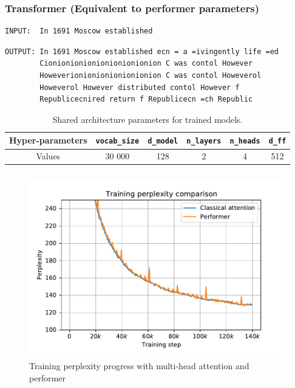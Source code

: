 \subsubsection*{Transformer (Equivalent to performer parameters)}
\begin{verbatim}
INPUT:  In 1691 Moscow established
\end{verbatim}
\begin{verbatim}
OUTPUT: In 1691 Moscow established ecn = a =ivingently life =ed 
        Cionionionionionionionionion C was contol However
        Howeverionionionionionionion C was contol Howeverol 
        Howeverol However distributed contol However f 
        Republicecnired return f Republicecn =ch Republic
\end{verbatim}

\begin{table}[H]
    \centering
    \begin{tabular}{|c|c|c|c|c|c|}
    \hline
    Hyper-parameters & \texttt{vocab\_size} &  \texttt{d\_model} & \texttt{n\_layers} & \texttt{n\_heads} & \texttt{d\_ff} \\ \hline
    Values & 30 000 & 128 & 2 & 4 & 512\\ \hline
    \end{tabular}
    \caption{Shared architecture parameters for trained models.}
    \label{tab:paramshared}
\end{table}

\begin{figure}[H]
    \centering
    \includegraphics[height=8cm]{obrazky/train.pdf}
    \caption{Training perplexity progress with multi-head attention and performer}
    \label{fig:trainningprogress}
\end{figure}

\newpage
